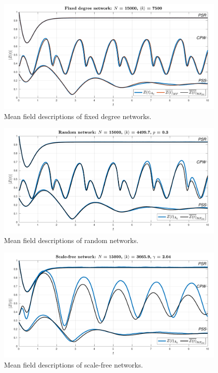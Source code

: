 \begin{figure}[H]
  \includegraphics[width=\linewidth]{../Figures/InspectMeanFieldFixedDegree.pdf}
  \caption{Mean field descriptions of fixed degree networks.}\label{fig:InspectMeanFieldFixedDegree}
\end{figure}

\begin{figure}[H]
  \includegraphics[width=\linewidth]{../Figures/InspectMeanFieldRandom.pdf}
  \caption{Mean field descriptions of random networks.}\label{fig:InspectMeanFieldRandom}
\end{figure}

\begin{figure}[H]
  \includegraphics[width=\linewidth]{../Figures/InspectMeanFieldScaleFree.pdf}
  \caption{Mean field descriptions of scale-free networks.}\label{fig:InspectMeanFieldScaleFree}
\end{figure}

